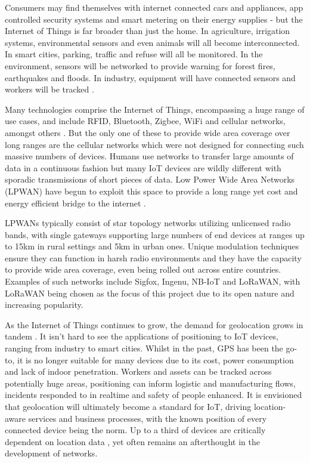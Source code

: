 \documentclass[a4paper]{report}
\begin{document}
  Consumers may find themselves with internet connected cars and appliances, app controlled security systems and smart metering on their energy supplies - but the Internet of Things is far broader than just the home. In agriculture, irrigation systems, environmental sensors and even animals will all become interconnected. In smart cities, parking, traffic and refuse will all be monitored. In the environment, sensors will be networked to provide warning for forest fires, earthquakes and floods. In industry, equipment will have connected sensors and workers will be tracked \cite{Lestable}.

  Many technologies comprise the Internet of Things, encompassing a huge range of use cases, and include RFID, Bluetooth, Zigbee, WiFi and cellular networks, amongst others \cite{Vangelista2015}. But the only one of these to provide wide area coverage over long ranges are the cellular networks which were not designed for connecting such massive numbers of devices. Humans use networks to transfer large amounts of data in a continuous fashion but many IoT devices are wildly different with sporadic transmissions of short pieces of data. Low Power Wide Area Networks (LPWAN) have begun to exploit this space to provide a long range yet cost and energy efficient bridge to the internet \cite{Centenaro}.

  LPWANs typically consist of star topology networks utilizing unlicensed radio bands, with single gateways supporting large numbers of end devices at ranges up to 15km in rural settings and 5km in urban ones. Unique modulation techniques ensure they can function in harsh radio environments and they have the capacity to provide wide area coverage, even being rolled out across entire countries. Examples of such networks include Sigfox, Ingenu, NB-IoT and LoRaWAN, with LoRaWAN being chosen as the focus of this project due to its open nature and increasing popularity.

  As the Internet of Things continues to grow, the demand for geolocation grows in tandem \cite{Wyres17}. It isn't hard to see the applications of positioning to IoT devices, ranging from industry to smart cities. Whilst in the past, GPS has been the go-to, it is no longer suitable for many devices due to its cost, power consumption and lack of indoor penetration. Workers and assets can be tracked across potentially huge areas, positioning can inform logistic and manufacturing flows, incidents responded to in realtime and safety of people enhanced. It is envisioned that geolocation will ultimately become a standard for IoT, driving location-aware services and business processes, with the known position of every connected device being the norm. Up to a third of devices are critically dependent on location data \cite{Semtechgeo}, yet often remains an afterthought in the development of networks.
\end{document}

